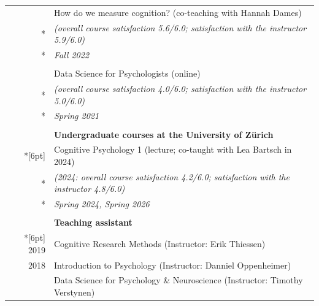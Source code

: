 \documentclass[letterpaper]{article}
\begin{document}
\begin{longtable}{rl}
       & How do we measure cognition? (co-teaching with Hannah Dames)                                             \\*
       & {\it (overall course satisfaction 5.6/6.0; satisfaction with the instructor 5.9/6.0)}                    \\*
       & {\it Fall 2022}                                                                                          \\
       &                                                                                                          \\
       & Data Science for Psychologists (online)                                                                  \\*
       & {\it (overall course satisfaction 4.0/6.0; satisfaction with the instructor 5.0/6.0)}                    \\*
       & {\it Spring 2021}                                                                                        \\
       &                                                                                                          \\
       & \textbf{Undergraduate courses at the University of Zürich}                                               \\*[6pt]
       & Cognitive Psychology 1 (lecture; co-taught with Lea Bartsch in 2024)                                     \\*
       & {\it (2024: overall course satisfaction 4.2/6.0; satisfaction with the instructor 4.8/6.0)}              \\*
       & {\it Spring 2024, Spring 2026}                                                                           \\
       &                                                                                                          \\
       & \textbf{Teaching assistant}                                                                              \\*[6pt]
       2019 & Cognitive Research Methods (Instructor: Erik Thiessen)                                                   \\
       2018 & Introduction to Psychology (Instructor: Danniel Oppenheimer)                                             \\
       & Data Science for Psychology \& Neuroscience (Instructor: Timothy Verstynen)                              \\

\end{longtable}
\end{document}
